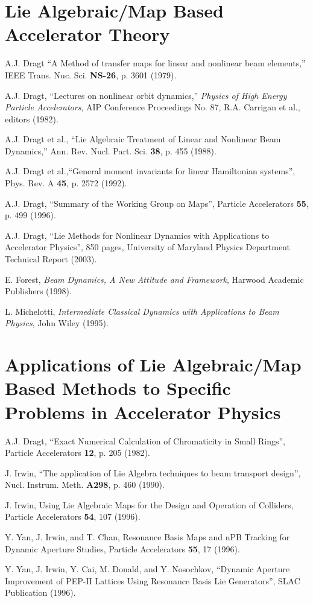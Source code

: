 \section{Lie Algebraic/Map Based Accelerator Theory}
\begin{description}
\item A.J. Dragt ``A Method of transfer maps for linear and nonlinear beam
    elements,'' IEEE Trans. Nuc. Sci. {\bf NS-26}, p. 3601 (1979).
\item A.J. Dragt, ``Lectures on nonlinear orbit dynamics,'' {\em Physics of High
    Energy Particle Accelerators}, AIP Conference Proceedings No. 87, R.A.
    Carrigan et al., editors (1982).
\item A.J. Dragt et al., ``Lie Algebraic Treatment of Linear and
Nonlinear Beam Dynamics,'' Ann. Rev. Nucl. Part. Sci. {\bf 38}, p. 455 (1988).
\item A.J. Dragt et al.,``General moment invariants for linear Hamiltonian systems'', Phys. Rev. A {\bf 45}, p. 2572 (1992).
\item A.J. Dragt, ``Summary of the Working Group on Maps'', Particle Accelerators {\bf 55}, p. 499 (1996).
\item A.J. Dragt, ``Lie Methods for Nonlinear Dynamics with Applications to Accelerator Physics'', 850 pages, University of Maryland Physics Department Technical Report (2003).
\item E. Forest, {\em Beam Dynamics, A New Attitude and Framework}, Harwood Academic Publishers (1998).
\item L. Michelotti, {\em Intermediate Classical Dynamics with Applications to Beam Physics}, John Wiley (1995).
\end{description}
\section{Applications of Lie Algebraic/Map Based Methods to Specific
Problems in Accelerator Physics}
\begin{description}
\item A.J. Dragt, ``Exact Numerical Calculation of Chromaticity in Small
    Rings'', Particle Accelerators {\bf 12}, p. 205 (1982).
\item J. Irwin, ``The application of Lie Algebra techniques to beam transport design'', Nucl. Instrum. Meth. {\bf A298}, p. 460 (1990).
\item J. Irwin, Using Lie Algebraic Maps for the Design and Operation of Colliders, Particle Accelerators {\bf 54}, 107 (1996).
\item Y. Yan, J. Irwin, and T. Chan, Resonance Basis Maps and nPB Tracking for Dynamic Aperture Studies, Particle Accelerators {\bf 55}, 17 (1996).
\item Y. Yan, J. Irwin, Y. Cai, M. Donald, and Y. Nosochkov, ``Dynamic Aperture Improvement of PEP-II Lattices Using Resonance Basis Lie Generators'', SLAC Publication (1996).
\end{description}
